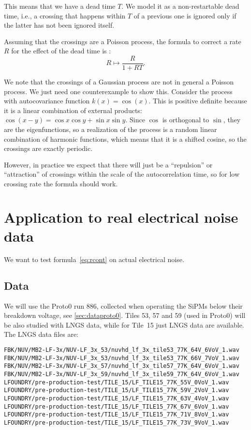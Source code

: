 This means that we have a dead time $T$. We model it as a non-restartable dead
time, i.e., a crossing that happens within $T$ of a previous one is ignored
only if the latter has not been ignored itself.

Assuming that the crossings are a Poisson process, the formula to correct a
rate $R$ for the effect of the dead time is \cite[120]{knoll2010}:
%
\begin{equation}
    R \mapsto \frac R {1 + RT}. \label{eq:deadrate}
\end{equation}

We note that the crossings of a Gaussian process are not in general a Poisson
process. We just need one counterexample to show this. Consider the process
with autocovariance function $k(x)=\cos(x)$. This is positive definite because
it is a linear combination of external products: $\cos(x-y) = \cos x \cos y +
\sin x \sin y$. Since $\cos$ is orthogonal to $\sin$, they are the
eigenfunctions, so a realization of the process is a random linear combination
of harmonic functions, which means that it is a shifted cosine, so the
crossings are exactly periodic.

However, in practice we expect that there will just be a ``repulsion'' or
``attraction'' of crossings within the scale of the autocorrelation time, so
for low crossing rate the formula should work.

\section{Application to real electrical noise data}

We want to test formula~\eqref{eq:rcont} on actual electrical noise.

\subsection{Data}

We will use the Proto0 run 886, collected when operating the SiPMs below their
breakdown voltage, see \autoref{sec:dataproto0}. Tiles 53, 57 and 59 (used in
Proto0) will be also studied with LNGS data, while for Tile~15 just LNGS data
are available. The LNGS data files are:
%
\begin{verbatim}
FBK/NUV/MB2-LF-3x/NUV-LF_3x_53/nuvhd_lf_3x_tile53_77K_64V_6VoV_1.wav
FBK/NUV/MB2-LF-3x/NUV-LF_3x_53/nuvhd_lf_3x_tile53_77K_66V_7VoV_1.wav
FBK/NUV/MB2-LF-3x/NUV-LF_3x_57/nuvhd_lf_3x_tile57_77K_64V_6VoV_1.wav
FBK/NUV/MB2-LF-3x/NUV-LF_3x_59/nuvhd_lf_3x_tile59_77K_64V_6VoV_1.wav
LFOUNDRY/pre-production-test/TILE_15/LF_TILE15_77K_55V_0VoV_1.wav
LFOUNDRY/pre-production-test/TILE_15/LF_TILE15_77K_59V_2VoV_1.wav
LFOUNDRY/pre-production-test/TILE_15/LF_TILE15_77K_63V_4VoV_1.wav
LFOUNDRY/pre-production-test/TILE_15/LF_TILE15_77K_67V_6VoV_1.wav
LFOUNDRY/pre-production-test/TILE_15/LF_TILE15_77K_71V_8VoV_1.wav
LFOUNDRY/pre-production-test/TILE_15/LF_TILE15_77K_73V_9VoV_1.wav
\end{verbatim}

